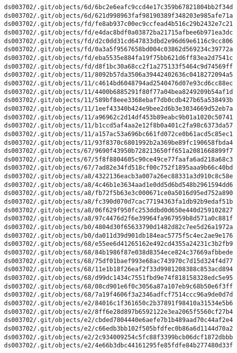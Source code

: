 \documentclass[11pt]{article}
\begin{document}
\begin{Verbatim}[commandchars=\\\{\}]
ds003702/.git/objects/6d/6bc2e6eafc9ccd4e17c359b67821804bb2f34d
ds003702/.git/objects/6d/621d998963faf98190389f348203e985afe71a
ds003702/.git/objects/fd/fe8ab937c00ec9ccfead4b516c29b2432e7c21
ds003702/.git/objects/fd/e4dac8bdf0a03872ba21715afbee6b971ea3dc
ds003702/.git/objects/fd/d2c0dd31cd647833dbd2e96d69e6116c9cc806
ds003702/.git/objects/fd/0a3a5f9567658bd004c03862d569234c39772a
ds003702/.git/objects/fd/eba5535e884fa19f75bb621d6ff83ea2d7541c
ds003702/.git/objects/fd/d8f1bc30a68cc2f1a275133f5464c9d74569ff
ds003702/.git/objects/11/8092b57da3506a39442402636c0418272094a5
ds003702/.git/objects/11/c4614bd6048794ad2540476d07e93cd6cc88ec
ds003702/.git/objects/11/4400b6885291f80f77a04bea8249209b54af1d
ds003702/.git/objects/11/589bf8eee3368ebaf7db0cdb427b65a538493b
ds003702/.git/objects/11/1eef43340b424e9bee2d6b3e3034669d52eb7a
ds003702/.git/objects/11/a96962c2d14df453b89eabc9b01a1020c50741
ds003702/.git/objects/11/b1ccd5af4aa2e12f8b0a401c2fa98c6373da57
ds003702/.git/objects/11/a157ac53a696bc661fd072ce0b61acd5c85ec1
ds003702/.git/objects/11/93f8370c6801992b2a369be89fc190658fbda4
ds003702/.git/objects/67/9690f43950b728213650ff651a2081668899f7
ds003702/.git/objects/67/5f8f8804605c90ce49ce77faafa6ad218a68c3
ds003702/.git/objects/67/7ad82e34fd518cf00c752f1895aaa9b66c40bd
ds003702/.git/objects/a8/4322136eacb3a007a26ec88331a3d910c8c58e
ds003702/.git/objects/a8/4c46b1e3634aad1e0dd5d6bd548b2961594dd6
ds003702/.git/objects/a8/fb72f5b63e3c000671ce0a5016d95ed752a890
ds003702/.git/objects/a8/fc390d070d7cac77194363fa1db92b9edaf51b
ds003702/.git/objects/a8/06f629f950fc253ddbd0d650e440d259102827
ds003702/.git/objects/a8/97c4476d2f6e39964fa967959b8d571a0c881f
ds003702/.git/objects/b0/4804d30f65633790d1482d82c7ee5d26a1972a
ds003702/.git/objects/b0/da011d39d901db184eac5775f5c4ec2ae9e176
ds003702/.git/objects/68/e55ee6d41265162e492cd4355a24231c3b2fb9
ds003702/.git/objects/68/84b1986f87e038d8354ece824c37669afbbede
ds003702/.git/objects/68/75df01baef993e68ac743970c7d15d324f4d77
ds003702/.git/objects/68/11e1b18f26eaf2f33d9981208388c853acd894
ds003702/.git/objects/68/d99dc1434c7551fbd9e74f818158328edc5e95
ds003702/.git/objects/68/08cd901e6f0c3056a87a107eb9c68b50e6f3ff
ds003702/.git/objects/68/7a19f4606f3a2346adfcf7514ccc96a9de0d7d
ds003702/.git/objects/e2/84016c1f361650c2b37891f98410a31534e5b6
ds003702/.git/objects/e2/8ff6e28d897b6592122e3ea2065f5560cf27b4
ds003702/.git/objects/e2/cbded7804440e6aefe7b1b489aad70c44af2e4
ds003702/.git/objects/e2/c66edb3bb102f505bfdfec0b86a6d1144d70a2
ds003702/.git/objects/e2/2c934009254c5fc88f3399bcb06dcf1872dbbb
ds003702/.git/objects/e2/4e66b3dbc44161295fe85fdfe84b277480d33f

\end{Verbatim}
\end{document}
